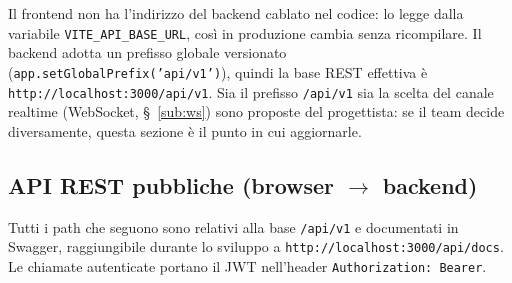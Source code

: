 \documentclass[11pt,a4paper]{article}
\begin{document}
Il frontend non ha l'indirizzo del backend cablato nel codice: lo legge dalla variabile \texttt{VITE\_\allowbreak{}API\_\allowbreak{}BASE\_\allowbreak{}URL}, così in produzione cambia senza ricompilare. Il backend adotta un prefisso globale versionato (\texttt{app.\allowbreak{}setGlobalPrefix('api/v1')}), quindi la base REST effettiva è \texttt{http://\allowbreak{}localhost:3000/\allowbreak{}api/v1}. Sia il prefisso \texttt{/api/v1} sia la scelta del canale realtime (WebSocket, \S~\ref{sub:ws}) sono proposte del progettista: se il team decide diversamente, questa sezione è il punto in cui aggiornarle.

\subsection{API REST pubbliche (browser $\to$ backend)}

Tutti i path che seguono sono relativi alla base \texttt{/api/v1} e documentati in Swagger, raggiungibile durante lo sviluppo a \texttt{http://localhost:3000/api/docs}. Le chiamate autenticate portano il JWT nell'header \texttt{Authorization: Bearer}.
\end{document}
